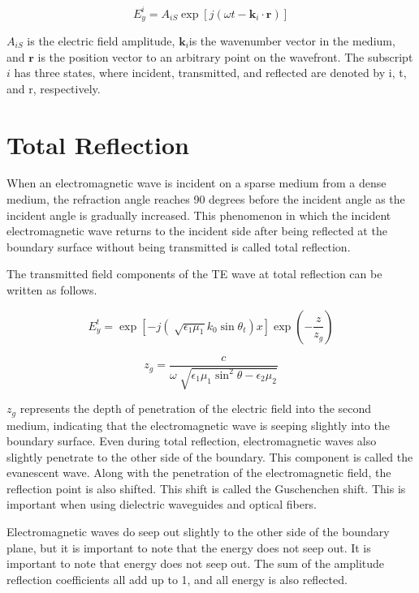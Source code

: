 \documentclass[a4paper,11pt]{jsarticle}
\begin{document}
\begin{equation}
  E^i_y = A_{iS}\exp[j(\omega t - \boldsymbol{k}_i\cdot\boldsymbol{r})]
\end{equation}

$A_{iS}$ is the electric field amplitude,
$\boldsymbol{k}_i$is the wavenumber vector in the medium, and
$\boldsymbol{r}$ is the position vector to an arbitrary point on the wavefront.
The subscript $i$ has three states,
where incident, transmitted, and reflected are denoted by i, t, and r, respectively.

\section{Total Reflection}

When an electromagnetic wave is incident on a sparse medium from a dense medium,
the refraction angle reaches 90 degrees before the incident angle
as the incident angle is gradually increased.
This phenomenon in which the incident electromagnetic wave
returns to the incident side after being reflected
at the boundary surface without being transmitted is called total reflection.

The transmitted field components of the TE wave at total reflection
can be written as follows.


\begin{equation}
  E^t_y = \exp[-j(\sqrt[]{\epsilon_1\mu_1}k_0\sin\theta_t)x]\exp\left(-\frac{z}{z_g}\right)
\end{equation}

\begin{equation}
  z_g = \frac{c}{\omega\sqrt[]{\epsilon_1\mu_1\sin^{2}\theta - \epsilon_2\mu_2}}
\end{equation}

$z_g$ represents the depth of penetration of the electric field into the second medium,
indicating that the electromagnetic wave is seeping slightly into the boundary surface.
Even during total reflection, 
electromagnetic waves also slightly penetrate to the other side of the boundary.
This component is called the evanescent wave.
Along with the penetration of the electromagnetic field,
the reflection point is also shifted.
This shift is called the Guschenchen shift.
This is important when using dielectric waveguides and optical fibers.


Electromagnetic waves do seep out slightly
to the other side of the boundary plane,
but it is important to note that the energy does not seep out.
It is important to note that energy does not seep out.
The sum of the amplitude reflection coefficients all add up to 1,
and all energy is also reflected.
\end{document}
